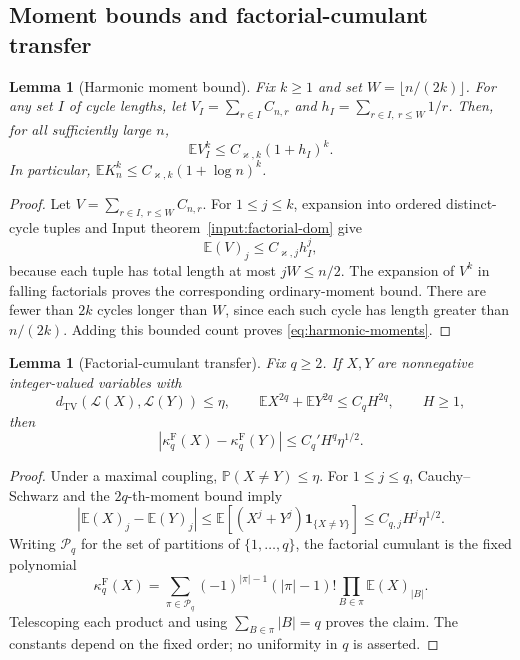 \documentclass[11pt]{article}
\numberwithin{equation}{section}
\newcommand{\E}{\mathbb E}
\newcommand{\Pp}{\mathbb P}
\newcommand{\TV}{d_{\mathrm{TV}}}
\newcommand{\one}{\mathbf 1}
\newcommand{\cL}{\mathcal L}
\newcommand{\cP}{\mathcal P}
\newtheorem{lemma}[theorem]{Lemma}
\theoremstyle{definition}
\theoremstyle{remark}
\begin{document}
\subsection{Moment bounds and factorial-cumulant transfer}

\begin{lemma}[Harmonic moment bound]\label{lem:harmonic-moments}
Fix $k\ge1$ and set $W=\lfloor n/(2k)\rfloor$.  For any set $I$ of
cycle lengths, let $V_I=\sum_{r\in I}C_{n,r}$ and
$h_I=\sum_{r\in I,\ r\le W}1/r$.  Then, for all sufficiently large $n$,
\begin{equation}\label{eq:harmonic-moments}
 \E V_I^k\le C_{\varkappa,k}(1+h_I)^k.
\end{equation}
In particular, $\E K_n^k\le C_{\varkappa,k}(1+\log n)^k$.
\end{lemma}
\begin{proof}
Let $V=\sum_{r\in I,\ r\le W}C_{n,r}$.  For $1\le j\le k$, expansion
into ordered distinct-cycle tuples and Input theorem~\ref{input:factorial-dom} give
\[
 \E(V)_j\le C_{\varkappa,j}h_I^j,
\]
because each tuple has total length at most $jW\le n/2$.
The expansion of $V^k$ in falling factorials proves the corresponding
ordinary-moment bound.  There are fewer than $2k$ cycles longer than $W$,
since each such cycle has length greater than $n/(2k)$.  Adding this
bounded count proves \eqref{eq:harmonic-moments}.
\end{proof}

\begin{lemma}[Factorial-cumulant transfer]\label{lem:cumulant-transfer}
Fix $q\ge2$.  If $X,Y$ are nonnegative integer-valued variables with
\[
 \TV(\cL(X),\cL(Y))\le\eta,\qquad
 \E X^{2q}+\E Y^{2q}\le C_q H^{2q},\qquad H\ge1,
\]
then
\begin{equation}\label{eq:cumulant-transfer}
 \left|\kappa_q^{\mathrm F}(X)-\kappa_q^{\mathrm F}(Y)\right|
 \le C_q'H^q\eta^{1/2}.
\end{equation}
\end{lemma}
\begin{proof}
Under a maximal coupling, $\Pp(X\ne Y)\le\eta$.  For $1\le j\le q$,
Cauchy--Schwarz and the $2q$-th-moment bound imply
\[
 |\E(X)_j-\E(Y)_j|
 \le\E[(X^j+Y^j)\one_{\{X\ne Y\}}]
 \le C_{q,j}H^j\eta^{1/2}.
\]
Writing $\cP_q$ for the set of partitions of $\{1,\ldots,q\}$,
the factorial cumulant is the fixed polynomial
\[
 \kappa_q^{\mathrm F}(X)
 =\sum_{\pi\in\cP_q}
 (-1)^{|\pi|-1}(|\pi|-1)!
 \prod_{B\in\pi}\E(X)_{|B|}.
\]
Telescoping each product and using $\sum_{B\in\pi}|B|=q$ proves the claim.
The constants depend on the fixed order; no uniformity in $q$ is asserted.
\end{proof}
\end{document}
